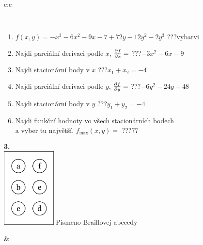 \documentclass[10pt]{report}
\begin{document}
\begin{tabular}{c:c}
\begin{minipage}[c][104.5mm][t]{0.5\linewidth}
\begin{center}
\begin{minipage}{0.95\linewidth}
\begin{center}
\end{center}
\end{minipage}
\\[1mm]
\begin{minipage}{0.79\linewidth}
\begin{center}
\begin{varwidth}{\linewidth}
\begin{enumerate}
\normalsize
\item $f(x,y)=-x^3-6x^2-9x-7+72y-12y^2-2y^3$\quad \dotfill\; ???\;\dotfill \quad vybarvi
\item Najdi parciální derivaci podle $x$, $\pdv{f}{x}=$\quad \dotfill\; ???\;\dotfill \quad $-3x^2-6x-9$
\item Najdi stacionární body v $x$\quad \dotfill\; ???\;\dotfill \quad $x_1+x_2=-4$
\item Najdi parciální derivaci podle $y$, $\pdv{f}{y}=$\quad \dotfill\; ???\;\dotfill \quad $-6y^2-24y+48$
\item Najdi stacionární body v $y$\quad \dotfill\; ???\;\dotfill \quad $y_1+y_2=-4$
\item Najdi funkční hodnoty vo všech stacionárních bodech \\ \phantom{xxxxxx} a vyber tu najvětší. $f_{\text{max}}(x,y)=$\quad \dotfill\; ???\;\dotfill \quad $77$
\end{enumerate}
\end{varwidth}
\end{center}
\end{minipage}
\begin{minipage}{0.20\linewidth}
\begin{center}
{\Huge\bfseries 3.} \\[2mm]
\includegraphics[height=40mm]{../images/braille.png}
{\small Písmeno Braillovej abecedy}
\end{center}
\end{minipage}
\end{center}
\end{minipage}
&
\begin{minipage}[c][104.5mm][t]{0.5\linewidth}
\begin{center}

\end{center}
\end{minipage}
\end{tabular}
\end{document}

